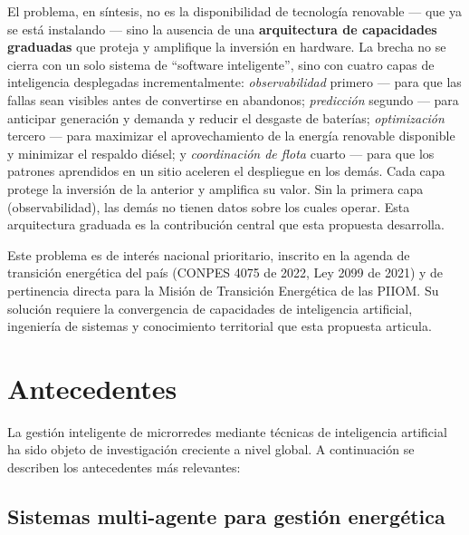 \documentclass[12pt,letterpaper]{article}
\begin{document}
El problema, en s\'intesis, no es la disponibilidad de tecnolog\'ia renovable --- que ya se est\'a instalando --- sino la ausencia de una \textbf{arquitectura de capacidades graduadas} que proteja y amplifique la inversi\'on en hardware. La brecha no se cierra con un solo sistema de ``software inteligente'', sino con cuatro capas de inteligencia desplegadas incrementalmente: \textit{observabilidad} primero --- para que las fallas sean visibles antes de convertirse en abandonos; \textit{predicci\'on} segundo --- para anticipar generaci\'on y demanda y reducir el desgaste de bater\'ias; \textit{optimizaci\'on} tercero --- para maximizar el aprovechamiento de la energ\'ia renovable disponible y minimizar el respaldo di\'esel; y \textit{coordinaci\'on de flota} cuarto --- para que los patrones aprendidos en un sitio aceleren el despliegue en los dem\'as. Cada capa protege la inversi\'on de la anterior y amplifica su valor. Sin la primera capa (observabilidad), las dem\'as no tienen datos sobre los cuales operar. Esta arquitectura graduada es la contribuci\'on central que esta propuesta desarrolla.

Este problema es de inter\'es nacional prioritario, inscrito en la agenda de transici\'on energ\'etica del pa\'is (CONPES 4075 de 2022, Ley 2099 de 2021) y de pertinencia directa para la Misi\'on de Transici\'on Energ\'etica de las PIIOM. Su soluci\'on requiere la convergencia de capacidades de inteligencia artificial, ingenier\'ia de sistemas y conocimiento territorial que esta propuesta articula.

\section{Antecedentes}

La gesti\'on inteligente de microrredes mediante t\'ecnicas de inteligencia artificial ha sido objeto de investigaci\'on creciente a nivel global. A continuaci\'on se describen los antecedentes m\'as relevantes:

\subsection*{Sistemas multi-agente para gesti\'on energ\'etica}
\end{document}
